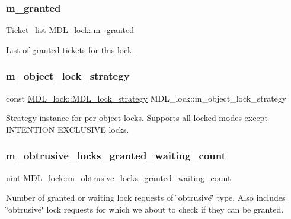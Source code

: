 \subsubsection{\texorpdfstring{m\+\_\+granted}{m\_granted}}
{\footnotesize\ttfamily \mbox{\hyperlink{classMDL__lock_1_1Ticket__list}{Ticket\+\_\+list}} M\+D\+L\+\_\+lock\+::m\+\_\+granted}

\mbox{\hyperlink{classList}{List}} of granted tickets for this lock. \mbox{\label{classMDL__lock_a6ed94b58baea6bf2e22b76566aa513b3}} 
\subsubsection{\texorpdfstring{m\+\_\+object\+\_\+lock\+\_\+strategy}{m\_object\_lock\_strategy}}
{\footnotesize\ttfamily const \mbox{\hyperlink{structMDL__lock_1_1MDL__lock__strategy}{M\+D\+L\+\_\+lock\+::\+M\+D\+L\+\_\+lock\+\_\+strategy}} M\+D\+L\+\_\+lock\+::m\+\_\+object\+\_\+lock\+\_\+strategy\hspace{0.3cm}{\ttfamily [static]}}

Strategy instance for per-\/object locks. Supports all locked modes except I\+N\+T\+E\+N\+T\+I\+ON E\+X\+C\+L\+U\+S\+I\+VE locks. \mbox{\label{classMDL__lock_a7ef26eb4cf46309c494135291a82e20c}} 
\subsubsection{\texorpdfstring{m\+\_\+obtrusive\+\_\+locks\+\_\+granted\+\_\+waiting\+\_\+count}{m\_obtrusive\_locks\_granted\_waiting\_count}}
{\footnotesize\ttfamily uint M\+D\+L\+\_\+lock\+::m\+\_\+obtrusive\+\_\+locks\+\_\+granted\+\_\+waiting\+\_\+count}

Number of granted or waiting lock requests of \char`\"{}obtrusive\char`\"{} type. Also includes \char`\"{}obtrusive\char`\"{} lock requests for which we about to check if they can be granted.


